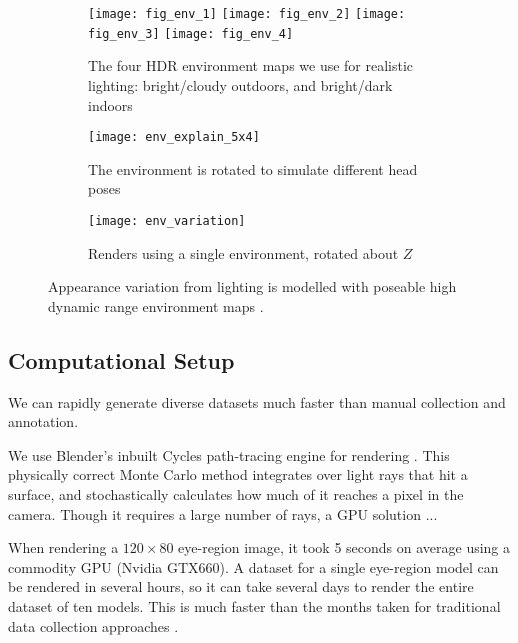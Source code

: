 \begin{figure}

    \begin{subfigure}[t]{\columnwidth}
        \texttt{[image: fig\_env\_1]} \hfill
    	\texttt{[image: fig\_env\_2]} \hfill
        \texttt{[image: fig\_env\_3]} \hfill
    	\texttt{[image: fig\_env\_4]}
	    \caption{The four HDR environment maps we use for realistic lighting: bright/cloudy outdoors, and bright/dark indoors}
    \end{subfigure}
    \par \medskip
    \begin{subfigure}[t]{0.48\columnwidth}
        \texttt{[image: env\_explain\_5x4]}
    	\caption{The environment is rotated to simulate different head poses}
    \end{subfigure}%
    \hfill
    \begin{subfigure}[t]{0.48\columnwidth}
        \texttt{[image: env\_variation]}
        \caption{Renders using a single environment, rotated about $Z$}
        \label{fig:env_map_imgs_examples}
    \end{subfigure}
    \caption{Appearance variation from lighting is modelled with poseable high dynamic range environment maps \cite{debevec2002image}.}
    \label{fig:environment_maps}
\end{figure}

\subsection{Computational Setup}


We can rapidly generate diverse datasets much faster than manual collection and annotation.

We use Blender's inbuilt Cycles path-tracing engine for rendering . This physically correct Monte Carlo method integrates over light rays that hit a surface, and stochastically calculates how much of it reaches a pixel in the camera. Though it requires a large number of rays, a GPU solution ...

When rendering a $120\!\times\!80$ eye-region image, it took 5 seconds on average using a commodity GPU (Nvidia GTX660). A dataset for a single eye-region model can be rendered in several hours, so it can take several days to render the entire dataset of ten models. This is much faster than the months taken for traditional data collection approaches \cite{zhang15_cvpr}.